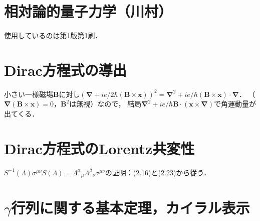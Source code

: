 \chapter*{相対論的量子力学（川村）}
使用しているのは第1版第1刷．
\chapter{Dirac方程式の導出}
小さい一様磁場$\boldsymbol{B}$に対し$(\boldsymbol{\nabla} + ie/2\hbar(\boldsymbol{B}\times\boldsymbol{x}))^2=\boldsymbol{\nabla}^2 + ie/\hbar(\boldsymbol{B}\times\boldsymbol{x})\cdot\boldsymbol{\nabla}$．
（$\boldsymbol{\nabla}(\boldsymbol{B}\times\boldsymbol{x})=0$，$\boldsymbol{B}^2$は無視）なので，
結局$\boldsymbol{\nabla}^2 + ie/\hbar\boldsymbol{B}\cdot(\boldsymbol{x}\times\boldsymbol{\nabla})$で角運動量が出てくる．

\chapter{Dirac方程式のLorentz共変性}
$S^{ - 1}(\Lambda)\sigma^{\mu\nu}S(\Lambda)=\Lambda^\alpha{}_\mu\Lambda^\beta{}_\nu\sigma^{\mu\nu}$の証明：(2.16)と(2.23)から従う．

\chapter{$\gamma$行列に関する基本定理，カイラル表示}
